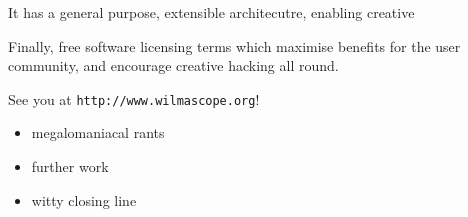 \documentclass[runningheads]{cl2emult}
\newcommand{\url}[1]{{\small{\tt #1}}}
\begin{document}
It has a general purpose, extensible architecutre, enabling creative 

Finally, free software licensing terms which
maximise benefits for the user community, and encourage creative hacking all
round.

See you at \url{http://www.wilmascope.org}!

\begin{itemize}
\item megalomaniacal rants
\item further work
\item witty closing line
\end{itemize}

%
%
%
%
%
%
%


\newpage
{}


%
\end{document}
